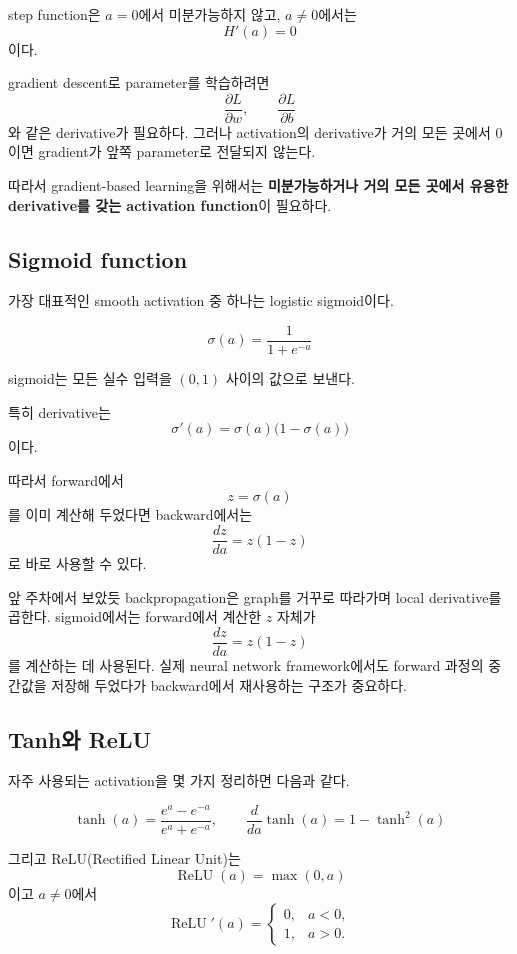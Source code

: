\documentclass[11pt,a4paper]{article}
\newcommand{\sigmoid}{\sigma}
\begin{document}
step function은 $a=0$에서 미분가능하지 않고, $a\neq0$에서는
\[
H'(a)=0
\]
이다.

gradient descent로 parameter를 학습하려면
\[
\frac{\partial L}{\partial w},
\qquad
\frac{\partial L}{\partial b}
\]
와 같은 derivative가 필요하다.
그러나 activation의 derivative가 거의 모든 곳에서 $0$이면
gradient가 앞쪽 parameter로 전달되지 않는다.

따라서 gradient-based learning을 위해서는
\textbf{미분가능하거나 거의 모든 곳에서 유용한 derivative를 갖는 activation function}이 필요하다.

\subsection{Sigmoid function}

가장 대표적인 smooth activation 중 하나는 logistic sigmoid이다.

\[
\boxed{
\sigmoid(a)
=
\frac{1}{1+e^{-a}}
}
\]

sigmoid는 모든 실수 입력을 $(0,1)$ 사이의 값으로 보낸다.

특히 derivative는
\[
\boxed{
\sigmoid'(a)
=
\sigmoid(a)\bigl(1-\sigmoid(a)\bigr)
}
\]
이다.

따라서 forward에서
\[
z=\sigmoid(a)
\]
를 이미 계산해 두었다면 backward에서는
\[
\boxed{
\frac{dz}{da}=z(1-z)
}
\]
로 바로 사용할 수 있다.

\begin{thinkbox}
앞 주차에서 보았듯 backpropagation은 graph를 거꾸로 따라가며 local derivative를 곱한다.
sigmoid에서는 forward에서 계산한 $z$ 자체가
\[
\frac{dz}{da}=z(1-z)
\]
를 계산하는 데 사용된다.
실제 neural network framework에서도 forward 과정의 중간값을 저장해 두었다가 backward에서 재사용하는 구조가 중요하다.
\end{thinkbox}

\subsection{Tanh와 ReLU}

자주 사용되는 activation을 몇 가지 정리하면 다음과 같다.

\[
\tanh(a)
=
\frac{e^a-e^{-a}}{e^a+e^{-a}},
\qquad
\boxed{
\frac{d}{da}\tanh(a)=1-\tanh^2(a)
}
\]

그리고 ReLU(Rectified Linear Unit)는
\[
\boxed{
\operatorname{ReLU}(a)=\max(0,a)
}
\]
이고 $a\neq0$에서
\[
\operatorname{ReLU}'(a)
=
\begin{cases}
0,&a<0,\\
1,&a>0.
\end{cases}
\]
\end{document}
